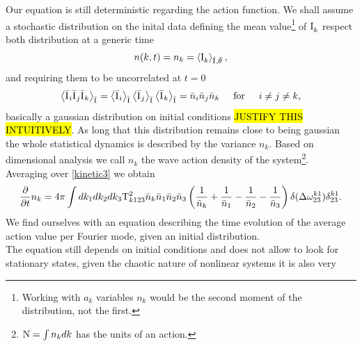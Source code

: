 Our equation is still deterministic regarding the action function. We shall assume a stochastic distribution on the inital data defining 
the mean value\footnote{Working with $a_k$ variables $n_k$ would be the second moment of the distribution, not the first.}
of $\mathrm{I}^{}_k$ respect both distribution at a generic time
\begin{equation}
    n(k,t) = n_k = \left\langle \mathrm{I}^{}_k \right\rangle_{\bar{\mathrm{I}^{}}, \bar{\theta}^{}},
\end{equation}     
and requiring them to be uncorrelated at $t=0$ \\
\begin{equation}
    \left\langle \bar{\mathrm{I}^{}}_i \bar{\mathrm{I}^{}}_j \bar{\mathrm{I}^{}}_k\right\rangle_{\bar{\mathrm{I}^{}}} = 
    \left\langle\bar{\mathrm{I}^{}}_i \right\rangle_{\bar{\mathrm{I}^{}}} \left\langle \bar{\mathrm{I}^{}}_j \right\rangle_{\bar{\mathrm{I}^{}}} \left\langle \bar{\mathrm{I}^{}}_k \right\rangle_{\bar{\mathrm{I}^{}}}
    = \bar{n}_i \bar{n}_j \bar{n}_k \hspace{5mm} \text{for} \hspace{5mm} i\neq j\neq k, 
\end{equation}
basically a gaussian distribution on initial conditions \hl{JUSTIFY THIS INTUITIVELY}. As long that this distribution remains close to being gaussian the whole statistical dynamics
is described by the variance $n_k$. Based on dimensional analysis we call 
$n_k$ the wave action density of the system\footnote{$\mathrm{N} = \int n_k dk$ has the units of an action.}.\\
Averaging over \eqref{kinetic3} we obtain
\begin{equation}
    \frac{\partial}{\partial t} n_k = 4 \pi\int dk_1 dk_2 dk_3 \\
    \mathrm{T}^2_{k123}\bar{n}_k\bar{n}_1\bar{n}_2\bar{n}_3
    \left(\frac{1}{\bar{n}_k} + \frac{1}{\bar{n}_1} - \frac{1}{\bar{n}_2}- \frac{1}{\bar{n}_3}  \right)
    \delta(\Delta{\omega}^{k1}_{23})\delta^{k1}_{23}.
    \label{kinetic4}
\end{equation}
We find ourselves with an equation describing the time evolution of the average action value per Fourier mode, given an initial distribution.\\
The equation still depends on initial conditions and does not allow to look for stationary states, given the chaotic nature of nonlinear systems it is also very 
